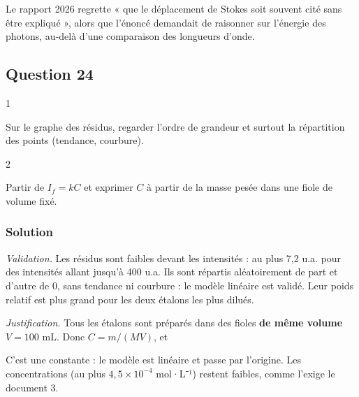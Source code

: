 \documentclass[11pt,a4paper]{article}
\newcommand{\equationajustee}[1]{%
  \sbox{\boiteequation}{$\displaystyle #1$}%
  \ifdim\wd\boiteequation>\linewidth
    \[\resizebox{\linewidth}{!}{\usebox{\boiteequation}}\]%
  \else
    \[#1\]%
  \fi}
\begin{document}
\begin{jury}

Le rapport 2026 regrette « que le déplacement de Stokes soit souvent cité sans être expliqué », alors que l'énoncé demandait de raisonner sur l'énergie des photons, au-delà d'une comparaison des longueurs d'onde.

\end{jury}

\hypertarget{question-24}{%
\subsection{Question 24}\label{question-24}}

\begin{indication}{1}

Sur le graphe des résidus, regarder l'ordre de grandeur et surtout la répartition des points (tendance, courbure).

\end{indication}

\begin{indication}{2}

Partir de \(I_f = kC\) et exprimer \(C\) à partir de la masse pesée dans une fiole de volume fixé.

\end{indication}

\hypertarget{solution-23}{%
\subsubsection{Solution}\label{solution-23}}

\emph{Validation.} Les résidus sont faibles devant les intensités : au plus 7,2 u.a. pour des intensités allant jusqu'à 400 u.a. Ils sont répartis aléatoirement de part et d'autre de 0, sans tendance ni courbure : le modèle linéaire est validé. Leur poids relatif est plus grand pour les deux étalons les plus dilués.

\emph{Justification.} Tous les étalons sont préparés dans des fioles \textbf{de même volume} \(V = 100\) mL. Donc \(C = m/(MV)\), et

\equationajustee{\boxed{I_f = \frac{k}{MV}\,m}}

\equationajustee{\frac{k}{MV} = 45{,}196\ \mathrm{u.a.\cdot mg^{-1}}}

C'est une constante : le modèle est linéaire et passe par l'origine. Les concentrations (au plus \(4{,}5\times10^{-4}\) mol·L⁻¹) restent faibles, comme l'exige le document 3.
\end{document}
